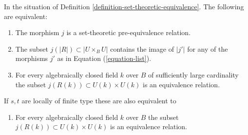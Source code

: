 %
\begin{lemma}
\label{lemma-set-theoretic-pre-equivalence-geometric}
In the situation of Definition \ref{definition-set-theoretic-equivalence}.
The following are equivalent:
\begin{enumerate}
\item The morphism $j$ is a set-theoretic pre-equivalence relation.
\item The subset $j(|R|) \subset |U \times_B U|$ contains the image of
$|j'|$ for any of the morphisms $j'$ as in Equation (\ref{equation-list}).
\item For every algebraically closed field $k$ over $B$ of sufficiently large
cardinality the subset $j(R(k)) \subset U(k) \times U(k)$ is an equivalence
relation.
\end{enumerate}
If $s, t$ are locally of finite type these are also equivalent to
\begin{enumerate}
\item[(4)] For every algebraically closed field $k$ over $B$
the subset $j(R(k)) \subset U(k) \times U(k)$ is an equivalence relation.
\end{enumerate}
\end{lemma}

